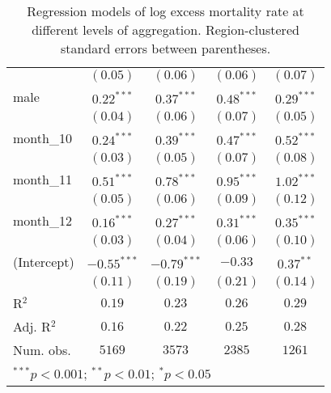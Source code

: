 \begin{table}[h!]
\begin{center}
\begin{small}
\begin{tabular}{l c c c c}
               & $(0.05)$      & $(0.06)$      & $(0.06)$      & $(0.07)$      \\
male           & $0.22^{***}$  & $0.37^{***}$  & $0.48^{***}$  & $0.29^{***}$  \\
               & $(0.04)$      & $(0.06)$      & $(0.07)$      & $(0.05)$      \\
month\_10      & $0.24^{***}$  & $0.39^{***}$  & $0.47^{***}$  & $0.52^{***}$  \\
               & $(0.03)$      & $(0.05)$      & $(0.07)$      & $(0.08)$      \\
month\_11      & $0.51^{***}$  & $0.78^{***}$  & $0.95^{***}$  & $1.02^{***}$  \\
               & $(0.05)$      & $(0.06)$      & $(0.09)$      & $(0.12)$      \\
month\_12      & $0.16^{***}$  & $0.27^{***}$  & $0.31^{***}$  & $0.35^{***}$  \\
               & $(0.03)$      & $(0.04)$      & $(0.06)$      & $(0.10)$      \\
(Intercept)    & $-0.55^{***}$ & $-0.79^{***}$ & $-0.33$       & $0.37^{**}$   \\
               & $(0.11)$      & $(0.19)$      & $(0.21)$      & $(0.14)$      \\
\hline
R$^2$          & $0.19$        & $0.23$        & $0.26$        & $0.29$        \\
Adj. R$^2$     & $0.16$        & $0.22$        & $0.25$        & $0.28$        \\
Num. obs.      & $5169$        & $3573$        & $2385$        & $1261$        \\
\hline
\multicolumn{5}{l}{\tiny{$^{***}p<0.001$; $^{**}p<0.01$; $^{*}p<0.05$}}
\end{tabular}
\end{small}
\caption{Regression models of log excess mortality rate at different levels of aggregation. Region-clustered standard errors between parentheses.}
\label{tab:regionmodels}
\end{center}
\end{table}
